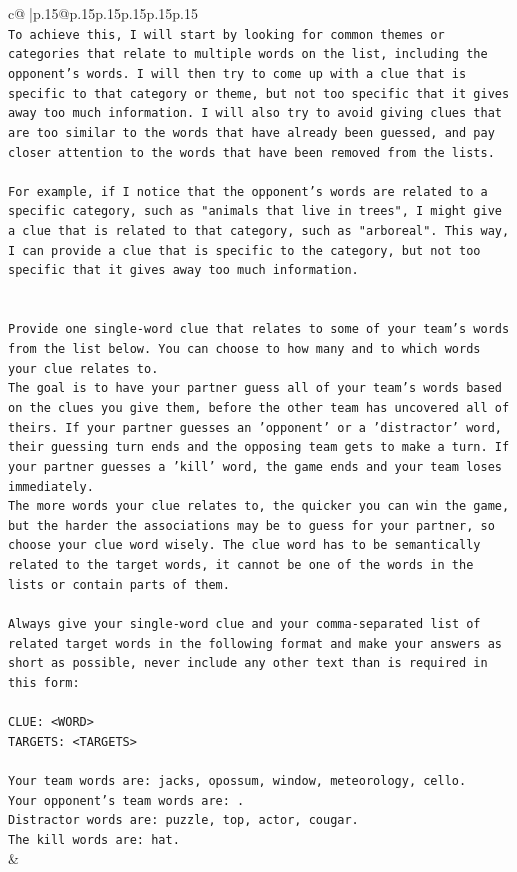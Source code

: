 \documentclass{article}
\begin{document}
{\begin{supertabular}{c@{$\;$}|p{.15\linewidth}@{}p{.15\linewidth}p{.15\linewidth}p{.15\linewidth}p{.15\linewidth}p{.15\linewidth}}
{{{\\ 
\texttt{To achieve this, I will start by looking for common themes or categories that relate to multiple words on the list, including the opponent's words. I will then try to come up with a clue that is specific to that category or theme, but not too specific that it gives away too much information. I will also try to avoid giving clues that are too similar to the words that have already been guessed, and pay closer attention to the words that have been removed from the lists.} \\
\\ 
\texttt{For example, if I notice that the opponent's words are related to a specific category, such as "animals that live in trees", I might give a clue that is related to that category, such as "arboreal". This way, I can provide a clue that is specific to the category, but not too specific that it gives away too much information.} \\
\\ 
\\ 
\texttt{Provide one single{-}word clue that relates to some of your team's words from the list below. You can choose to how many and to which words your clue relates to.} \\
\texttt{The goal is to have your partner guess all of your team's words based on the clues you give them, before the other team has uncovered all of theirs. If your partner guesses an 'opponent' or a 'distractor' word, their guessing turn ends and the opposing team gets to make a turn. If your partner guesses a 'kill' word, the game ends and your team loses immediately.} \\
\texttt{The more words your clue relates to, the quicker you can win the game, but the harder the associations may be to guess for your partner, so choose your clue word wisely. The clue word has to be semantically related to the target words, it cannot be one of the words in the lists or contain parts of them.} \\
\\ 
\texttt{Always give your single{-}word clue and your comma{-}separated list of related target words in the following format and make your answers as short as possible, never include any other text than is required in this form:} \\
\\ 
\texttt{CLUE: <WORD>} \\
\texttt{TARGETS: <TARGETS>} \\
\\ 
\texttt{Your team words are: jacks, opossum, window, meteorology, cello.} \\
\texttt{Your opponent's team words are: .} \\
\texttt{Distractor words are: puzzle, top, actor, cougar.} \\
\texttt{The kill words are: hat.} \\
            }
        }
    }
    & \\ \\


\end{supertabular}}
\end{document}

